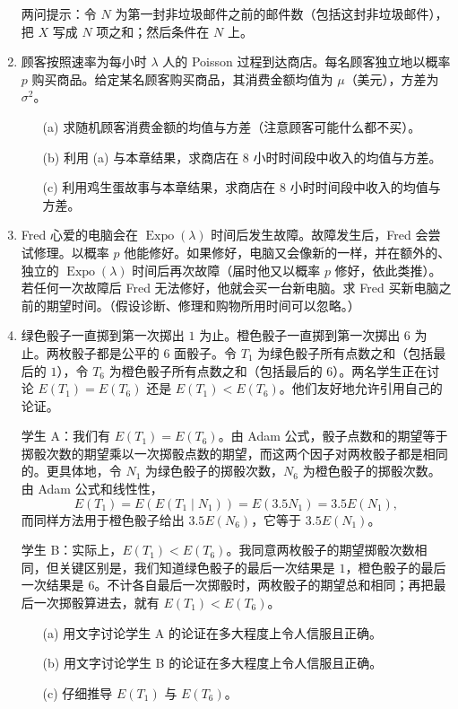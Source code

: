\documentclass[UTF8,12pt,a4paper,fontset=fandol]{ctexart}
\begin{document}
\begin{enumerate}
  \noindent 两问提示：令 $N$ 为第一封非垃圾邮件之前的邮件数（包括这封非垃圾邮件），把 $X$ 写成 $N$ 项之和；然后条件在 $N$ 上。

  \item 顾客按照速率为每小时 $\lambda$ 人的 Poisson 过程到达商店。每名顾客独立地以概率 $p$ 购买商品。给定某名顾客购买商品，其消费金额均值为 $\mu$（美元），方差为 $\sigma^2$。
  \begin{enumerate}
    \item[(a)] 求随机顾客消费金额的均值与方差（注意顾客可能什么都不买）。
    \item[(b)] 利用 (a) 与本章结果，求商店在 8 小时时间段中收入的均值与方差。
    \item[(c)] 利用鸡生蛋故事与本章结果，求商店在 8 小时时间段中收入的均值与方差。
  \end{enumerate}

  \item Fred 心爱的电脑会在 $\operatorname{Expo}(\lambda)$ 时间后发生故障。故障发生后，Fred 会尝试修理。以概率 $p$ 他能修好。如果修好，电脑又会像新的一样，并在额外的、独立的 $\operatorname{Expo}(\lambda)$ 时间后再次故障（届时他又以概率 $p$ 修好，依此类推）。若任何一次故障后 Fred 无法修好，他就会买一台新电脑。求 Fred 买新电脑之前的期望时间。（假设诊断、修理和购物所用时间可以忽略。）

  \item 绿色骰子一直掷到第一次掷出 $1$ 为止。橙色骰子一直掷到第一次掷出 $6$ 为止。两枚骰子都是公平的 6 面骰子。令 $T_1$ 为绿色骰子所有点数之和（包括最后的 $1$），令 $T_6$ 为橙色骰子所有点数之和（包括最后的 $6$）。两名学生正在讨论 $E(T_1)=E(T_6)$ 还是 $E(T_1)<E(T_6)$。他们友好地允许引用自己的论证。

  学生 A：我们有 $E(T_1)=E(T_6)$。由 Adam 公式，骰子点数和的期望等于掷骰次数的期望乘以一次掷骰点数的期望，而这两个因子对两枚骰子都是相同的。更具体地，令 $N_1$ 为绿色骰子的掷骰次数，$N_6$ 为橙色骰子的掷骰次数。由 Adam 公式和线性性，
  \[
    E(T_1)=E(E(T_1\mid N_1))=E(3.5N_1)=3.5E(N_1),
  \]
  而同样方法用于橙色骰子给出 $3.5E(N_6)$，它等于 $3.5E(N_1)$。

  学生 B：实际上，$E(T_1)<E(T_6)$。我同意两枚骰子的期望掷骰次数相同，但关键区别是，我们知道绿色骰子的最后一次结果是 $1$，橙色骰子的最后一次结果是 $6$。不计各自最后一次掷骰时，两枚骰子的期望总和相同；再把最后一次掷骰算进去，就有 $E(T_1)<E(T_6)$。
  \begin{enumerate}
    \item[(a)] 用文字讨论学生 A 的论证在多大程度上令人信服且正确。
    \item[(b)] 用文字讨论学生 B 的论证在多大程度上令人信服且正确。
    \item[(c)] 仔细推导 $E(T_1)$ 与 $E(T_6)$。
  \end{enumerate}


\end{enumerate}
\end{document}
